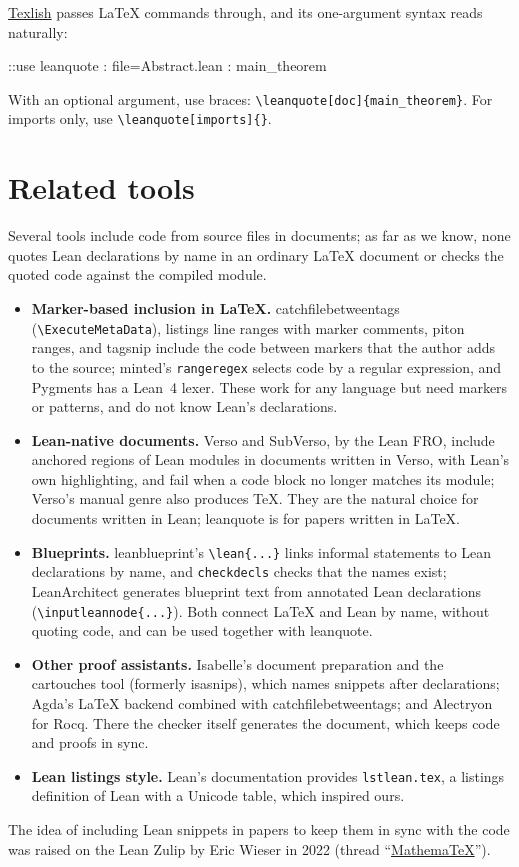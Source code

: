 \documentclass[11pt]{article}
\begin{document}
\href{https://texlish.org}{Texlish} passes \LaTeX{} commands through, and its one-argument
syntax reads naturally:
\begin{latexsrc}
::use leanquote
\leanquotesetup: file=Abstract.lean
\leanquote: main_theorem
\end{latexsrc}
With an optional argument, use braces: \verb|\leanquote[doc]{main_theorem}|.
For imports only, use \verb|\leanquote[imports]{}|.

\section{Related tools}

Several tools include code from source files in documents; as far as we know, none quotes Lean
declarations by name in an ordinary \LaTeX{} document or checks the quoted code against the
compiled module.
\begin{itemize}
\item \textbf{Marker-based inclusion in \LaTeX.}
  \textsf{catchfilebetweentags} (\verb|\ExecuteMetaData|), \textsf{listings} line ranges with
  marker comments, \textsf{piton} ranges, and \textsf{tagsnip} include the code between markers
  that the author adds to the source; \textsf{minted}'s \texttt{rangeregex} selects code by a
  regular expression, and Pygments has a Lean~4 lexer. These work for any language but need
  markers or patterns, and do not know Lean's declarations.
\item \textbf{Lean-native documents.} Verso and SubVerso, by the Lean FRO, include anchored
  regions of Lean modules in documents written in Verso, with Lean's own highlighting, and fail
  when a code block no longer matches its module; Verso's manual genre also produces \TeX.
  They are the natural choice for documents written in Lean; \textsf{leanquote} is for
  papers written in \LaTeX.
\item \textbf{Blueprints.} \textsf{leanblueprint}'s \verb|\lean{...}| links informal statements to
  Lean declarations by name, and \texttt{checkdecls} checks that the names exist;
  LeanArchitect generates blueprint text from annotated Lean declarations
  (\verb|\inputleannode{...}|). Both connect \LaTeX{} and Lean by name, without quoting code,
  and can be used together with \textsf{leanquote}.
\item \textbf{Other proof assistants.} Isabelle's document preparation and the
  \textsf{cartouches} tool (formerly \textsf{isasnips}), which names snippets after declarations;
  Agda's \LaTeX{} backend combined with \textsf{catchfilebetweentags}; and Alectryon for Rocq.
  There the checker itself generates the document, which keeps code and proofs in sync.
\item \textbf{Lean listings style.} Lean's documentation provides \texttt{lstlean.tex}, a
  \textsf{listings} definition of Lean with a Unicode table, which inspired ours.
\end{itemize}
The idea of including Lean snippets in papers to keep them in sync with the code was raised on
the Lean Zulip by Eric Wieser in 2022
(thread ``\href{https://leanprover-community.github.io/archive/stream/113488-general/topic/MathemaTeX.html}{MathemaTeX}'').
\end{document}
